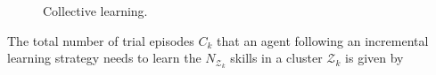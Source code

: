 \begin{figure}[!h]
	\hspace*{\fill}
	\caption[] {\label{fig:collective_learning} Collective learning.}
\end{figure}
\clearpage
The total number of trial episodes $ C_k $ that an agent following an incremental learning strategy needs to learn the $N_{\mathcal{Z}_k}$ skills in a cluster $ \mathcal{Z}_k $ is given by
